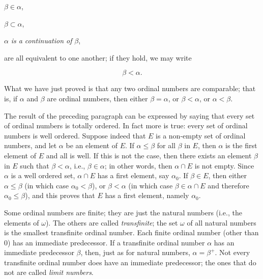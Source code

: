 \begin{center}
$\beta \in \alpha$,

$\beta \subset \alpha$,

$\alpha$ \textit{is a continuation of} $\beta$,
\end{center}

are all equivalent to one another; if they hold, we may write

\begin{equation*}
\beta < \alpha.
\end{equation*}

What we have just proved is that any two ordinal numbers are comparable; that is, if $\alpha$ and $\beta$ are ordinal numbers, then either $\beta = \alpha$, or $\beta < \alpha$, or $\alpha < \beta$. 

The result of the preceding paragraph can be expressed by saying that every set of ordinal numbers is totally ordered. In fact more is true: every set of ordinal numbers is well ordered. Suppose indeed that $E$ is a non-empty set of ordinal numbers, and let $\alpha$ be an element of $E$. If $\alpha \le  \beta$ for all $\beta$ in $E$, then $\alpha$ is the first element of $E$ and all is well. If this is not the case, then there exists an element $\beta$ in $E$ such that $\beta < \alpha$, i.e., $\beta \in \alpha$; in other words, then $\alpha \cap E$ is not empty. Since $\alpha$ is a well ordered set, $\alpha \cap E$ has a first element, say $\alpha_{0}$. If $\beta \in E$, then either $\alpha \le \beta$ (in which case $\alpha_{0} < \beta$), or $\beta < \alpha$ (in which case $\beta \in \alpha \cap E$ and therefore $\alpha_{0} \le \beta$), and this proves that $E$ has a first element, namely $\alpha_{0}$.

Some ordinal numbers are finite; they are just the natural numbers (i.e., the elements of $\omega$). The others are called \textit{transfinite}; the set $\omega$ of all natural numbers is the smallest transfinite ordinal number. Each finite ordinal number (other than $0$) has an immediate predecessor. If a transfinite ordinal number $\alpha$ has an immediate predecessor $\beta$, then, just as for natural numbers, $\alpha = \beta^{+}$. Not every transfinite ordinal number does have an immediate predecessor; the ones that do not are called \textit{limit numbers}. 

